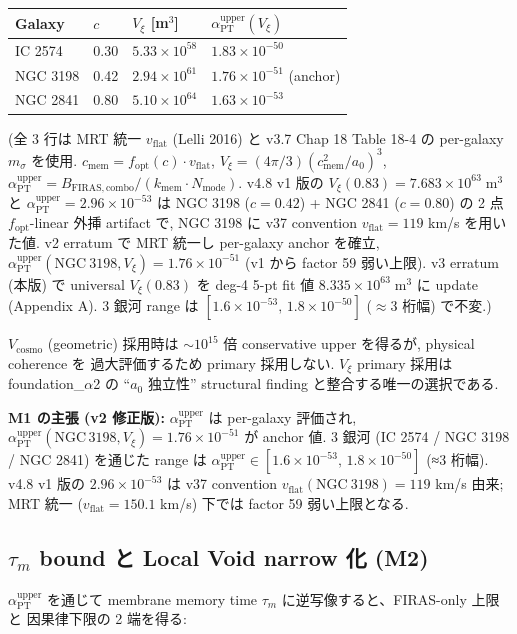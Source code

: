 \documentclass[11pt,a4paper]{ltjsarticle}
\newcommand{\kmem}{k_{\mathrm{mem}}}
\newcommand{\cmem}{c_{\mathrm{mem}}}
\newcommand{\Vxi}{V_{\xi}}
\newcommand{\Nmode}{N_{\mathrm{mode}}}
\newcommand{\aPT}{\alpha_{\mathrm{PT}}}
\newcommand{\taum}{\tau_{m}}
\newcommand{\BFIRAS}{B_{\mathrm{FIRAS,combo}}}
\newcommand{\msigma}{m_{\sigma}}
\newcommand{\vflat}{v_{\mathrm{flat}}}
\newcommand{\fopt}{f_{\mathrm{opt}}}
\begin{document}
\begin{center}\small
\begin{tabular}{@{}llll@{}}
\toprule
Galaxy & $c$ & $\Vxi$ [m$^3$] & $\aPT^{\mathrm{upper}}(\Vxi)$ \\
\midrule
IC 2574  & 0.30 & $5.33 \times 10^{58}$ & $1.83 \times 10^{-50}$ \\
NGC 3198 & 0.42 & $2.94 \times 10^{61}$ & $1.76 \times 10^{-51}$ (anchor) \\
NGC 2841 & 0.80 & $5.10 \times 10^{64}$ & $1.63 \times 10^{-53}$ \\
\bottomrule
\end{tabular}
\end{center}
\footnotesize
(全 3 行は MRT 統一 $\vflat$ (Lelli 2016) と v3.7 Chap 18 Table 18-4 の per-galaxy $\msigma$ を使用.
$\cmem = \fopt(c)\cdot\vflat$, $\Vxi = (4\pi/3)(\cmem^2/a_0)^3$,
$\aPT^{\mathrm{upper}} = \BFIRAS/(\kmem\cdot\Nmode)$. v4.8 v1 版の
$\Vxi(0.83) = 7.683\times10^{63}\;\mathrm{m}^3$ と $\aPT^{\mathrm{upper}} = 2.96\times10^{-53}$ は
NGC 3198 ($c=0.42$) + NGC 2841 ($c=0.80$) の 2 点 $\fopt$-linear 外挿 artifact で, NGC 3198 に v37
convention $\vflat=119$ km/s を用いた値. v2 erratum で MRT 統一し per-galaxy anchor を確立,
$\aPT^{\mathrm{upper}}(\mathrm{NGC~3198}, \Vxi) = 1.76\times10^{-51}$ (v1 から factor 59 弱い上限).
v3 erratum (本版) で universal $\Vxi(0.83)$ を deg-4 5-pt fit 値 $8.335\times10^{63}\;\mathrm{m}^3$
に update (Appendix A). 3 銀河 range は $[1.6\times10^{-53},\, 1.8\times10^{-50}]$ ($\approx$3 桁幅) で不変.)
\normalsize

\medskip\noindent
$V_{\mathrm{cosmo}}$ (geometric) 採用時は $\sim 10^{15}$ 倍 conservative upper を得るが, physical coherence を
過大評価するため primary 採用しない. $\Vxi$ primary 採用は foundation\_$\alpha$2 の ``$a_0$ 独立性'' structural
finding と整合する唯一の選択である.

\begin{keybox}
\textbf{M1 の主張 (v2 修正版):} $\aPT^{\mathrm{upper}}$ は per-galaxy 評価され,
$\aPT^{\mathrm{upper}}(\mathrm{NGC\,3198}, \Vxi) = 1.76 \times 10^{-51}$ が anchor 値. 3 銀河
(IC 2574 / NGC 3198 / NGC 2841) を通じた range は $\aPT^{\mathrm{upper}} \in [1.6\times10^{-53},\, 1.8\times10^{-50}]$
(≈3 桁幅). v4.8 v1 版の $2.96 \times 10^{-53}$ は v37 convention $\vflat(\mathrm{NGC~3198})=119$ km/s 由来;
MRT 統一 ($\vflat=150.1$ km/s) 下では factor 59 弱い上限となる.
\end{keybox}

\subsection{$\taum$ bound と Local Void narrow 化 (M2)}
$\aPT^{\mathrm{upper}}$ を通じて membrane memory time $\taum$ に逆写像すると、FIRAS-only 上限と
因果律下限の 2 端を得る:
\end{document}
